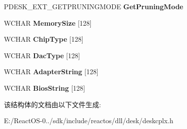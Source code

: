 \begin{DoxyCompactItemize}
\item 
\mbox{\label{struct___d_e_s_k___e_x_t___i_n_t_e_r_f_a_c_e_af0c3f25e6e988e520129650593e6bfde}} 
P\+D\+E\+S\+K\+\_\+\+E\+X\+T\+\_\+\+G\+E\+T\+P\+R\+U\+N\+I\+N\+G\+M\+O\+DE {\bfseries Get\+Pruning\+Mode}
\item 
\mbox{\label{struct___d_e_s_k___e_x_t___i_n_t_e_r_f_a_c_e_a7000f20e8cbce713740d6fa072ca3074}} 
W\+C\+H\+AR {\bfseries Memory\+Size} \mbox{[}128\mbox{]}
\item 
\mbox{\label{struct___d_e_s_k___e_x_t___i_n_t_e_r_f_a_c_e_ad74cd84b27defc3aa21c843d81d1ead5}} 
W\+C\+H\+AR {\bfseries Chip\+Type} \mbox{[}128\mbox{]}
\item 
\mbox{\label{struct___d_e_s_k___e_x_t___i_n_t_e_r_f_a_c_e_abc1ba4fa3d17da8eacb4e27faed0e229}} 
W\+C\+H\+AR {\bfseries Dac\+Type} \mbox{[}128\mbox{]}
\item 
\mbox{\label{struct___d_e_s_k___e_x_t___i_n_t_e_r_f_a_c_e_ab102bcc949b5fc92f0102824bab47e57}} 
W\+C\+H\+AR {\bfseries Adapter\+String} \mbox{[}128\mbox{]}
\item 
\mbox{\label{struct___d_e_s_k___e_x_t___i_n_t_e_r_f_a_c_e_aab303583fe69e2964f3006cc8c068da6}} 
W\+C\+H\+AR {\bfseries Bios\+String} \mbox{[}128\mbox{]}
\end{DoxyCompactItemize}


该结构体的文档由以下文件生成\+:\begin{DoxyCompactItemize}
\item 
E\+:/\+React\+O\+S-\/0../sdk/include/reactos/dll/desk/deskcplx.\+h\end{DoxyCompactItemize}
